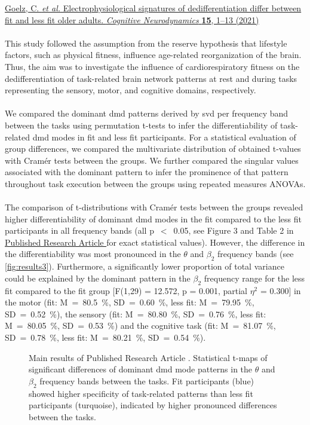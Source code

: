 \hyperref[pub:paperIII]{Goelz, C. \textit{et al.} Electrophysiological signatures of dedifferentiation differ between fit and less fit older adults. \textit{Cognitive Neurodynamics} \textbf{15}, 1--13 (2021)}\\
\\
This study followed the assumption from the reserve hypothesis that lifestyle factors, such as physical fitness, influence age-related reorganization of the brain. Thus, the aim was to investigate the influence of cardiorespiratory fitness on the dedifferentiation of task-related brain network patterns at rest and during tasks representing the sensory, motor, and cognitive domains, respectively.\\
\\
We compared the dominant \gls{dmd} patterns derived by \gls{svd} per frequency band between the tasks using permutation t-tests to infer the differentiability of task-related \gls{dmd} modes in fit and less fit participants. For a statistical evaluation of group differences, we compared the multivariate distribution of obtained t-values with Cramér tests between the groups. We further compared the singular values associated with the dominant pattern to infer the prominence of that pattern throughout task execution between the groups using repeated measures ANOVAs.\\
\\
The comparison of t-distributions with Cramér tests between the groups revealed higher differentiability of dominant \gls{dmd} modes in the fit compared to the less fit participants in all frequency bands (all p~$<$~0.05, see Figure 3 and Table 2 in \hyperref[pub:paperIII]{Published Research Article } for exact statistical values). However, the difference in the differentiability was most pronounced in the $\theta$ and $\beta_2$ frequency bands (see \autoref{fig:results3}). Furthermore, a significantly lower proportion of total variance could be explained by the dominant pattern in the $\beta_2$ frequency range for the less fit compared to the fit group [F(1,29) = 12.572, p = 0.001, partial $\eta^{2}$ = 0.300] in the motor (fit: M~=~80.5~\%, SD~=~0.60~\%, less fit: M~=~79.95~\%, SD~=~0.52~\%), the sensory (fit: M~=~80.80~\%, SD~=~0.76~\%, less fit: M~=~80.05~\%, SD~=~0.53~\%) and the cognitive task (fit: M~=~81.07~\%, SD~=~0.78~\%, less fit: M~=~80.21~\%, SD~=~0.54~\%).\\

\begin{figure}[ht]
    \centering
    
    \captionsetup{justification=justified}
    \caption[Main results of Published Research Article ]{Main results of Published Research Article . Statistical t-maps of significant differences of dominant \gls{dmd} mode patterns in the $\theta$ and $\beta_2$ frequency bands between the tasks. Fit participants (blue) showed higher specificity of task-related patterns than less fit participants (turquoise), indicated by higher pronounced differences between the tasks.}
    \label{fig:results3}
\end{figure}

